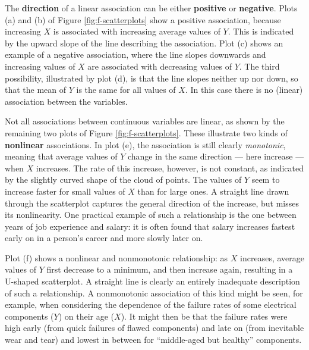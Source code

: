\documentclass[11pt,a4paper,openany]{book}
\begin{document}
The \textbf{direction} of a linear association can be either
\textbf{positive} or \textbf{negative}. Plots (a) and (b) of Figure
\ref{fig:f-scatterplots} show a positive association, because increasing
\(X\) is associated with increasing average values of \(Y\). This is
indicated by the upward slope of the line describing the association.
Plot (c) shows an example of a negative association, where the line
slopes downwards and increasing values of \(X\) are associated with
decreasing values of \(Y\). The third possibility, illustrated by plot
(d), is that the line slopes neither up nor down, so that the mean of
\(Y\) is the same for all values of \(X\). In this case there is no
(linear) association between the variables.

Not all associations between continuous variables are linear, as shown
by the remaining two plots of Figure \ref{fig:f-scatterplots}. These
illustrate two kinds of \textbf{nonlinear} associations. In plot (e),
the association is still clearly \emph{monotonic}, meaning that average
values of \(Y\) change in the same direction --- here increase --- when
\(X\) increases. The rate of this increase, however, is not constant, as
indicated by the slightly curved shape of the cloud of points. The
values of \(Y\) seem to increase faster for small values of \(X\) than
for large ones. A straight line drawn through the scatterplot captures
the general direction of the increase, but misses its nonlinearity. One
practical example of such a relationship is the one between years of job
experience and salary: it is often found that salary increases fastest
early on in a person's career and more slowly later on.

Plot (f) shows a nonlinear and nonmonotonic relationship: as \(X\)
increases, average values of \(Y\) first decrease to a minimum, and then
increase again, resulting in a U-shaped scatterplot. A straight line is
clearly an entirely inadequate description of such a relationship. A
nonmonotonic association of this kind might be seen, for example, when
considering the dependence of the failure rates of some electrical
components (\(Y\)) on their age (\(X\)). It might then be that the
failure rates were high early (from quick failures of flawed components)
and late on (from inevitable wear and tear) and lowest in between for
``middle-aged but healthy'' components.
\end{document}
